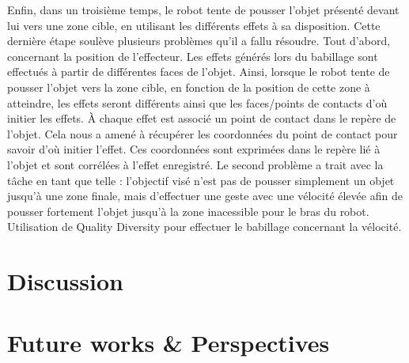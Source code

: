 \documentclass{llncs}
\begin{document}
Enfin, dans un troisième temps, le robot tente de pousser l'objet présenté devant lui vers une zone cible, en utilisant les différents effets à sa disposition. Cette dernière étape soulève plusieurs problèmes qu'il a fallu résoudre. Tout d'abord, concernant la position de l'effecteur. Les effets générés lors du babillage sont effectués à partir de différentes faces de l'objet. Ainsi, lorsque le robot tente de pousser l'objet vers la zone cible, en fonction de la position de cette zone à atteindre, les effets seront différents ainsi que les faces/points de contacts d'où initier les effets. \`A chaque effet est associé un point de contact dans le repère de l'objet. Cela nous a amené à récupérer les coordonnées du point de contact pour savoir d'où initier l'effet. Ces coordonnées sont exprimées dans le repère lié à l'objet et sont corrélées à l'effet enregistré. Le second problème a trait avec la tâche en tant que telle : l'objectif visé n'est pas de pousser simplement un objet jusqu'à une zone finale, mais d'effectuer une geste avec une vélocité élevée afin de pousser fortement l'objet jusqu'à la zone inacessible pour le bras du robot. Utilisation de Quality Diversity pour effectuer le babillage concernant la vélocité.



\section{Discussion}







\section{Future works \& Perspectives}
\end{document}
